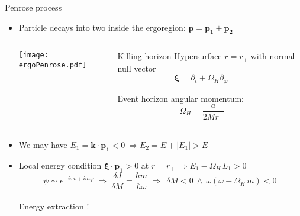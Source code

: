 \documentclass[9pt]{beamer}
\begin{document}
\begin{frame}[fragile]{Penrose process}
    \begin{itemize}
        \setlength\itemsep{0.8em}
        \item Particle decays into two inside the ergoregion: $\bm{p} = \bm{p_1} + \bm{p_2}$
        \vspace{0.1cm}
        \begin{columns}[T,onlytextwidth]        
            \begin{column}{0.7\textwidth}
                \centering
                \texttt{[image: ergoPenrose.pdf]}
            \end{column}
            \hfill
            \begin{column}{0.26\textwidth}
                \vspace*{0.5cm}
                \begin{block}{\small Killing horizon}
                    \footnotesize Hypersurface $r=r_{+}$ with normal null vector $$\bm{\xi} = \partial_t + \Omega_H \partial_\varphi \,\qquad$$ 
                    
                    Event horizon angular momentum:
                    $$\Omega_H = \frac{a}{2 M r_+} \qquad$$
                \end{block}
            \end{column}
        \end{columns}
        \vspace{0.3cm}
        \item We may have $E_1 = \bm{k} \cdot \bm{p_1} < 0 ~\Rightarrow E_2 = E + |E_1| > E $
        \item Local energy condition $\bm{\xi}\cdot\bm{p_1}>0$ at $r=r_{+} ~\Rightarrow E_1 - \Omega_H \, L_1 > 0$
        $$ \psi \sim e^{-i \omega t + i m \varphi} ~\Rightarrow~ \frac{\delta J}{\delta M} = \frac{\hbar m}{\hbar \omega} ~\Rightarrow~ \boxed{~\delta M < 0 ~\land~ \omega( \omega - \Omega_H \,m) < 0~} $$\\
        \hspace*{6.0cm}\alert{Energy extraction !}
    \end{itemize}
\end{frame}
\end{document}
